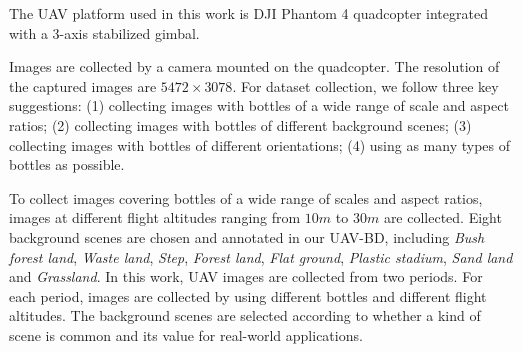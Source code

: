 %	
%	
%	



The UAV platform used in this work is DJI Phantom 4 quadcopter integrated with a 3-axis stabilized gimbal.

Images are collected by a camera mounted on the quadcopter. The resolution of the captured images are $ 5472\times 3078 $. For dataset collection, we follow three key suggestions: (1) collecting images with bottles of a wide range of scale and aspect ratios; (2) collecting images with bottles of different background scenes; (3) collecting images with bottles of different orientations; (4) using as many types of bottles as possible. 


To collect images covering bottles of a wide range of scales and aspect ratios, images at different flight altitudes ranging from $ 10m $ to $ 30m $ are collected. Eight background scenes are chosen and annotated in our UAV-BD, including \textit{Bush forest land}, \textit{Waste land}, \textit{Step}, \textit{Forest land}, \textit{Flat ground}, \textit{Plastic stadium}, \textit{Sand land} and \textit{Grassland}. In this work, UAV images are collected from two periods. For each period, images are collected by using different bottles and different flight altitudes. The background scenes are selected according to whether a kind of scene is common and its value for real-world applications\cite{DOTA}.

